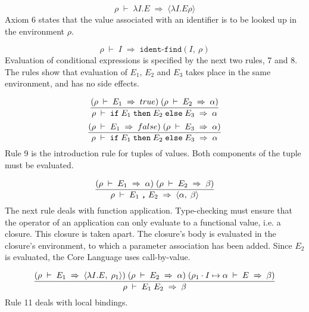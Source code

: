 \documentclass[10pt]{article}
\begin{document}
\begin{equation}
\rho{}\;\vdash{}\;\lambda{}I.E\;\Rightarrow{}\;\langle{}\lambda{}I.E\rho{}\rangle{}\end{equation}
Axiom 6 states that the value associated with an identifier is to be looked up in the environment $\rho{}$. 

\begin{equation}
\rho{}\;\vdash{}\;I\;\Rightarrow{}\;\texttt{ident-find}(I,\:\rho{})\end{equation}
Evaluation of conditional expressions is specified by the next two
rules, 7 and 8. The rules show that evaluation of $E_{1}$, $E_{2}$ and $E_{3}$ takes place in the same
environment, and has no side effects. 

\begin{equation}
\frac{{\mathrm\mathbf{}(}\rho{}\;\vdash{}\;E_{1}\;\Rightarrow{}\;true{\mathrm\mathbf{})}\;{\mathrm\mathbf{}(}\rho{}\;\vdash{}\;E_{2}\;\Rightarrow{}\;\alpha{}{\mathrm\mathbf{})}}%
{\rho{}\;\vdash{}\;\texttt{if}\;E_{1}\;\texttt{then}\;E_{2}\;\texttt{else}\;E_{3}\;\Rightarrow{}\;\alpha{}}\end{equation}
\begin{equation}
\frac{{\mathrm\mathbf{}(}\rho{}\;\vdash{}\;E_{1}\;\Rightarrow{}\;false{\mathrm\mathbf{})}\;{\mathrm\mathbf{}(}\rho{}\;\vdash{}\;E_{3}\;\Rightarrow{}\;\alpha{}{\mathrm\mathbf{})}}%
{\rho{}\;\vdash{}\;\texttt{if}\;E_{1}\;\texttt{then}\;E_{2}\;\texttt{else}\;E_{3}\;\Rightarrow{}\;\alpha{}}\end{equation}
Rule 9 is the introduction rule for tuples of values. Both components of the tuple must be evaluated. 

\begin{equation}
\frac{{\mathrm\mathbf{}(}\rho{}\;\vdash{}\;E_{1}\;\Rightarrow{}\;\alpha{}{\mathrm\mathbf{})}\;{\mathrm\mathbf{}(}\rho{}\;\vdash{}\;E_{2}\;\Rightarrow{}\;\beta{}{\mathrm\mathbf{})}}%
{\rho{}\;\vdash{}\;E_{1}\;\texttt{,}\;E_{2}\;\Rightarrow{}\;\langle{}\alpha{},\;\beta{}\rangle{}}\end{equation}
The next rule deals with function application. Type-checking must
ensure that the operator of an application can only evaluate to a
functional value, i.e. a closure. This closure is taken apart. The
closure's body is evaluated in the closure's environment, to which a
parameter association has been added. Since $E_{2}$ is
evaluated, the Core Language uses call-by-value. 

\begin{equation}
\frac{{\mathrm\mathbf{}(}\rho{}\;\vdash{}\;E_{1}\;\Rightarrow{}\;\langle{}\lambda{}I.E,\;\rho{}_{1}\rangle{}{\mathrm\mathbf{})}\;{\mathrm\mathbf{}(}\rho{}\;\vdash{}\;E_{2}\;\Rightarrow{}\;\alpha{}{\mathrm\mathbf{})}\;{\mathrm\mathbf{}(}\rho{}_{1}\cdot{}I\mapsto{}\alpha{}\;\vdash{}\;E\;\Rightarrow{}\;\beta{}{\mathrm\mathbf{})}}%
{\rho{}\;\vdash{}\;E_{1}\;E_{2}\;\Rightarrow{}\;\beta{}}\end{equation}
Rule 11 deals with local bindings. 
\end{document}
